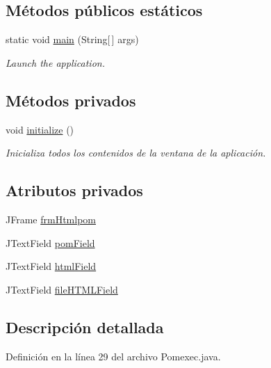 \subsection*{Métodos públicos estáticos}
\begin{DoxyCompactItemize}
\item 
static void \mbox{\hyperlink{a00028_a52ecabe81c9c3180cdccb3749b6553d6}{main}} (String\mbox{[}$\,$\mbox{]} args)
\begin{DoxyCompactList}\small\item\em Launch the application. \end{DoxyCompactList}\end{DoxyCompactItemize}
\subsection*{Métodos privados}
\begin{DoxyCompactItemize}
\item 
void \mbox{\hyperlink{a00028_ab89003495509c2f11da18c9675828571}{initialize}} ()
\begin{DoxyCompactList}\small\item\em Inicializa todos los contenidos de la ventana de la aplicación. \end{DoxyCompactList}\end{DoxyCompactItemize}
\subsection*{Atributos privados}
\begin{DoxyCompactItemize}
\item 
J\+Frame \mbox{\hyperlink{a00028_a1927e599316cd24b73c1148e28cb0532}{frm\+Htmlpom}}
\item 
J\+Text\+Field \mbox{\hyperlink{a00028_a7ea71ef0b61fa8df0b1689d11ce167cf}{pom\+Field}}
\item 
J\+Text\+Field \mbox{\hyperlink{a00028_a70bdb1d4b3b75dab759706ce0d85c9cf}{html\+Field}}
\item 
J\+Text\+Field \mbox{\hyperlink{a00028_ac458a48643144b5728bb22fdace1dada}{file\+H\+T\+M\+L\+Field}}
\end{DoxyCompactItemize}


\subsection{Descripción detallada}


Definición en la línea 29 del archivo Pomexec.\+java.



